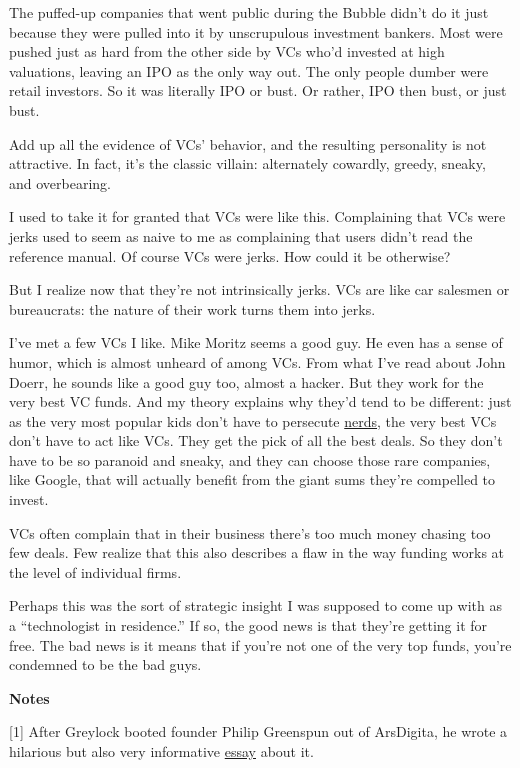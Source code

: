 The puffed-up companies that went public during the Bubble didn't do it
just because they were pulled into it by unscrupulous investment
bankers. Most were pushed just as hard from the other side by VCs who'd
invested at high valuations, leaving an IPO as the only way out. The
only people dumber were retail investors. So it was literally IPO or
bust. Or rather, IPO then bust, or just bust.

Add up all the evidence of VCs' behavior, and the resulting personality
is not attractive. In fact, it's the classic villain: alternately
cowardly, greedy, sneaky, and overbearing.

I used to take it for granted that VCs were like this. Complaining that
VCs were jerks used to seem as naive to me as complaining that users
didn't read the reference manual. Of course VCs were jerks. How could it
be otherwise?

But I realize now that they're not intrinsically jerks. VCs are like car
salesmen or bureaucrats: the nature of their work turns them into jerks.

I've met a few VCs I like. Mike Moritz seems a good guy. He even has a
sense of humor, which is almost unheard of among VCs. From what I've
read about John Doerr, he sounds like a good guy too, almost a hacker.
But they work for the very best VC funds. And my theory explains why
they'd tend to be different: just as the very most popular kids don't
have to persecute \href{nerds.html}{nerds}, the very best VCs don't have
to act like VCs. They get the pick of all the best deals. So they don't
have to be so paranoid and sneaky, and they can choose those rare
companies, like Google, that will actually benefit from the giant sums
they're compelled to invest.

VCs often complain that in their business there's too much money chasing
too few deals. Few realize that this also describes a flaw in the way
funding works at the level of individual firms.

Perhaps this was the sort of strategic insight I was supposed to come up
with as a ``technologist in residence.'' If so, the good news is that
they're getting it for free. The bad news is it means that if you're not
one of the very top funds, you're condemned to be the bad guys.

\textbf{Notes}

{[}1{]} After Greylock booted founder Philip Greenspun out of ArsDigita,
he wrote a hilarious but also very informative
\href{http://www.waxy.org/random/arsdigita/}{essay} about it.

